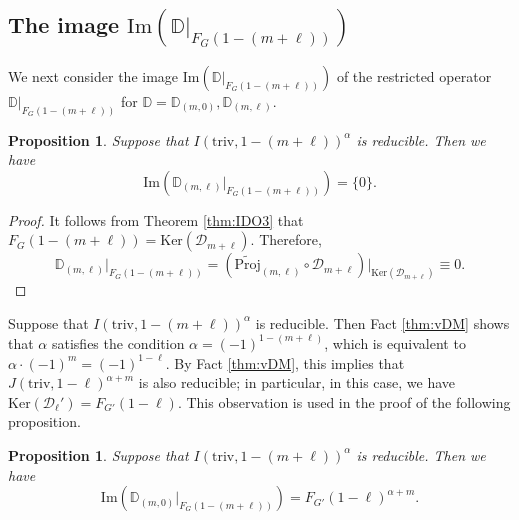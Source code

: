 \documentclass[reqno,11pt]{amsart}
\newtheorem{prop}[equation]{Proposition}
\theoremstyle{remark}
\theoremstyle{definition}
\numberwithin{equation}{section}
\newcommand{\ga}{\alpha}
\newcommand{\Cal}{\mathcal}
\renewcommand{\Im}{\mathrm{Im}}
\newcommand{\triv}{\mathrm{triv}}
\newcommand{\Ker}{\mathrm{Ker}}
\newcommand{\wProj}{\widetilde{\mathrm{Proj}}}
\newcommand{\D}{\Cal{D}}
\newcommand{\bD}{\mathbb{D}}
\begin{document}
\subsection{The image $\Im(\bD\vert_{F_{G}(1-(m+\ell))})$}

We next consider the image $\Im(\bD\vert_{F_{G}(1-(m+\ell))})$
of the restricted operator $\bD\vert_{F_{G}(1-(m+\ell))}$
for $\bD=\bD_{(m,0)}, \bD_{(m,\ell)}$.

\begin{prop}\label{prop:im3}
Suppose that $I(\triv, 1-(m+\ell))^\ga$ is reducible. Then we have 
\begin{equation*}
\Im(\bD_{(m,\ell)}\vert_{F_{G}(1-(m+\ell))}) = \{0\}.
\end{equation*}
\end{prop}

\begin{proof}
It follows from Theorem \ref{thm:IDO3} that 
$F_{G}(1-(m+\ell)) = \Ker(\D_{m+\ell})$. Therefore,
\begin{equation*}
\bD_{(m,\ell)}\vert_{F_{G}(1-(m+\ell))}
=(\wProj_{(m,\ell)} \circ \D_{m+\ell}) \vert_{\Ker(\D_{m+\ell})} \equiv 0.
\end{equation*}
\end{proof}

Suppose that  $I(\triv,1-(m+\ell))^\ga$ is reducible.
Then Fact \ref{thm:vDM} shows that $\ga$ satisfies the condition
$\ga = (-1)^{1-(m+\ell)}$, which is equivalent to 
$\ga\cdot (-1)^m = (-1)^{1-\ell}$. 
By Fact \ref{thm:vDM}, this implies that $J(\triv, 1-\ell)^{\ga+m}$ is also reducible;
in particular, in this case, we have 
$\Ker(\D_\ell') = F_{G'}(1-\ell)$. This observation is used in the proof of the 
following proposition.


\begin{prop}\label{prop:im4}
Suppose that $I(\triv, 1-(m+\ell))^\ga$ is reducible. Then we have 
\begin{equation*}
\Im(\bD_{(m,0)}\vert_{F_{G}(1-(m+\ell))}) = F_{G'}(1-\ell)^{\ga+m}.
\end{equation*}
\end{prop}
\end{document}
